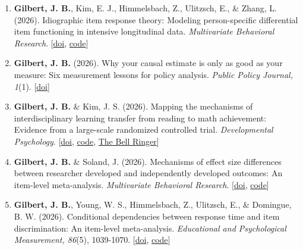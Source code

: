\documentclass[11pt]{article}
\begin{document}
\begin{enumerate}

\subsection{Peer-Reviewed Journal Publications (N = 43)}

\subsubsection{Sole or First Author (N = 19)}

\item \textbf{Gilbert, J. B.}, Kim, E. J., Himmelsbach, Z., Ulitzsch, E., \& Zhang, L. (2026). Idiographic item response theory: Modeling person-specific differential item functioning in intensive longitudinal data. \textit{Multivariate Behavioral Research}. [\href{https://doi.org/10.1080/00273171.2026.2740068}{doi}, \href{https://doi.org/10.7910/DVN/G68C5Y}{code}]
\item \textbf{Gilbert, J. B.} (2026). Why your causal estimate is only as good as your measure: Six measurement lessons for policy analysis. \textit{Public Policy Journal, 1}(1). [\href{https://doi.org/10.55845/3g7nnk66}{doi}]
\item \textbf{Gilbert, J. B.} \& Kim, J. S. (2026). Mapping the mechanisms of interdisciplinary learning transfer from reading to math achievement: Evidence from a large-scale randomized controlled trial. \textit{Developmental Psychology}. [\href{https://psycnet.apa.org/doi/10.1037/dev0002265}{doi}, \href{https://doi.org/10.7910/DVN/SP87ZL}{code}, \href{https://hollykorbey.substack.com/p/public-notice-4?utm_source=post-email-title&publication_id=235252&post_id=191361947&utm_campaign=email-post-title&isFreemail=false&r=44ycu&triedRedirect=true&utm_medium=email}{The Bell Ringer}] \label{more_mediation}
\item \textbf{Gilbert, J. B.} \& Soland, J. (2026). Mechanisms of effect size differences between researcher developed and independently developed outcomes: An item-level meta-analysis. \textit{Multivariate Behavioral Research}. [\href{https://www.tandfonline.com/doi/full/10.1080/00273171.2026.2707650}{doi}, \href{https://researchbox.org/3579}{code}]
\item \textbf{Gilbert, J. B.}, Young, W. S., Himmelsbach, Z., Ulitzsch, E., \& Domingue, B. W. (2026). Conditional dependencies between response time and item discrimination: An item-level meta-analysis. \textit{Educational and Psychological Measurement, 86}(5), 1039-1070. [\href{https://doi.org/10.1177/00131644261426972}{doi}, \href{https://doi.org/10.7910/DVN/OZUZ47}{code}] \label{rt_meta}

\end{enumerate}
\end{document}

